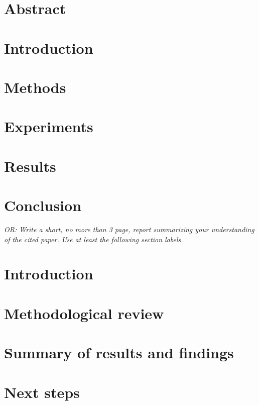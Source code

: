 \documentclass{article}
\begin{document}
\section{Abstract}
\section{Introduction}
\section{Methods}
\section{Experiments}
\section{Results}
\section{Conclusion}

\emph{OR: Write a short, no more than 3 page, report summarizing your understanding of the cited paper.  Use at least the following section labels.}
\setcounter{section}{0}

\section{Introduction}
\section{Methodological review} 
\section{Summary of results and findings}
\section{Next steps}
\end{document}
